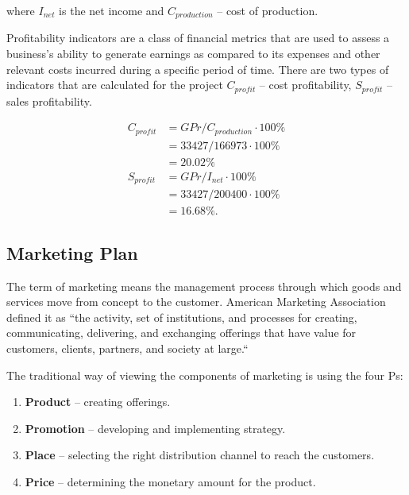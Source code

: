 \noindent
where $I_{net}$ is the net income and $C_{production}$ -- cost of production.

Profitability indicators are a class of financial metrics that are used to assess a business's ability to generate earnings as compared to its expenses and other relevant costs incurred during a specific period of time. There are two types of indicators that are calculated for the project $C_{profit}$ -- cost profitability, $S_{profit}$ -- sales profitability.

\begin{equation}
 \begin{split}
  C_{profit} &= GPr / C_{production} \cdot 100\%\\
             &= 33427 / 166973 \cdot 100\% \\
             &= 20.02 \%\\
  S_{profit} &= GPr / I_{net} \cdot 100\% \\
             &= 33427 / 200400 \cdot 100\% \\
             &= 16.68 \%.
 \end{split}
\end{equation}

\subsection{Marketing Plan}

The term of marketing means the management process through which goods and services move from concept to the customer. American Marketing Association defined it as ``the activity, set of institutions, and processes for creating, communicating, delivering, and exchanging offerings that have value for customers, clients, partners, and society at large.``\cite{marketing} 

The traditional way of viewing the components of marketing is using the four Ps:

\begin{enumerate}

\item \textbf{Product} -- creating offerings.
\item \textbf{Promotion} -- developing and implementing strategy.
\item \textbf{Place} -- selecting the right distribution channel to reach the customers.
\item \textbf{Price} -- determining the monetary amount for the product.

\end{enumerate}

